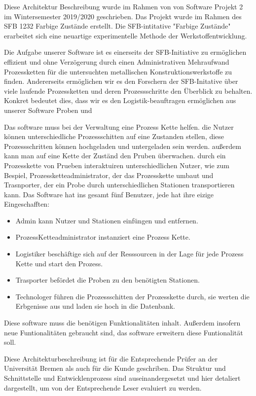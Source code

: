 \documentclass[enabledeprecatedfontcommands,fontsize=12pt,paper=a4,twoside]{scrartcl}
\begin{document}
Diese Architektur Beschreibung wurde im Rahmen von von Software Projekt 2 im Wintersemester 2019/2020 geschrieben.  Das Projekt wurde im Rahmen des SFB 1232 Farbige Zustände erstellt. Die SFB-intitative "Farbige Zustände" erarbeitet sich eine neuartige experimentelle Methode der Werkstoffentwicklung.

Die Aufgabe unserer Software ist es einerseits der SFB-Initiative zu ermöglichen effizient und ohne Verzögerung durch einen Administrativen Mehraufwand Prozessketten für die untersuchten metallischen Konstruktionswerkstoffe zu finden. Andererseits ermöglichen wir es den Forschern der SFB-Initative über viele laufende Prozessketten und deren Prozessschritte den Überblick zu behalten. Konkret bedeutet dies, dass wir es den Logistik-beauftragen ermöglichen aus unserer Software Proben und


Das software muss bei der Verwaltung eine Prozess Kette helfen. die Nutzer können unterschiedliche Prozessschitten auf eine Zustanden stellen, diese Prozessschritten können hochgeladen und untergeladen sein werden. außerdem kann man auf eine Kette der Zuständ den Pruben überwachen. durch ein Prozesskette von Prueben interaktuiren unterschiedlichen Nutzer, wie zum Bespiel, Prozessketteadministrator, der das Prozesskette umbaut und Trasnporter, der ein Probe durch unterschiedlichen Stationen transportieren kann. Das Software hat ins gesamt fünf Benutzer, jede hat ihre eizige Eingeschafften:

\begin{itemize}
  \item Admin kann Nutzer und Stationen einfüngen und entfernen.
  \item ProzessKetteadministrator instanziert eine Prozess Kette.
  \item Logistiker beschäftige sich auf der Resssourcen in der Lage für jede Prozess Kette und start den Prozess.
  \item  Trasporter befördet die Proben zu den benötigten Stationen.
 \item Technologer führen die Prozessschitten der Prozesskette durch, sie werten die Erbgenisse aus und laden sie hoch in die Datenbank.
\end{itemize}

Diese software muss die benötigen Funktionalitäten inhalt. Außerdem insofern neue Funtionalitäten gebraucht sind, das software erweitern diese Funtionalität soll.

Diese Architekturbeschreibung ist für die Entsprechende Prüfer an der Universität Bremen als auch für die Kunde geschriben.  Das Struktur und Schnittstelle und Entwicklenprozess sind auseinandergesetzt und hier detaliert dargestellt, um von der Entsprechende Leser evaluiert zu werden.
\end{document}
